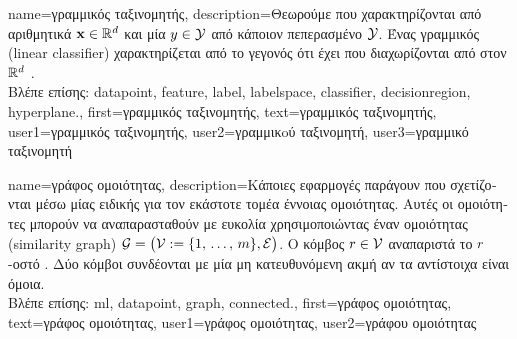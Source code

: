 {name={\foreignlanguage{greek}{γραμμικός ταξινομητής}}, 
	description={\foreignlanguage{greek}{Θεωρούμε} 
		 \foreignlanguage{greek}{που χαρακτηρίζονται από αριθμητικά}  
		${\bf x} \in \mathbb{R}^{d}$ \foreignlanguage{greek}{και μία}  $y \in \mathcal{Y}$ 
		\foreignlanguage{greek}{από κάποιον πεπερασμένο}  $\mathcal{Y}$. 
		\foreignlanguage{greek}{Ένας γραμμικός}  (linear classifier) \foreignlanguage{greek}{χαρακτηρίζεται από 
		το γεγονός ότι έχει}  \foreignlanguage{greek}{που διαχωρίζονται από}   
		\foreignlanguage{greek}{στον} $\mathbb{R}^{d}$ \cite[\foreignlanguage{greek}{Κεφ.} 2]{MLBasics}.
		\\
		\foreignlanguage{greek}{Βλέπε επίσης:} \gls{datapoint}, \gls{feature}, \gls{label}, \gls{labelspace}, \gls{classifier}, 
		\gls{decisionregion}, \gls{hyperplane}.},
	first={\foreignlanguage{greek}{γραμμικός ταξινομητής}},
	text={\foreignlanguage{greek}{γραμμικός ταξινομητής}},
	user1={\foreignlanguage{greek}{γραμμικός ταξινομητής}}, %
	user2={\foreignlanguage{greek}{γραμμι\-κoύ ταξινομητή}}, %
	user3={\foreignlanguage{greek}{γραμμικό ταξινομητή}} %
}

{name={\foreignlanguage{greek}{γράφος ομοιότητας}}, 
 	description={\foreignlanguage{greek}{Κάποιες εφαρμογές}  
		\foreignlanguage{greek}{παράγουν}  \foreignlanguage{greek}{που σχετίζονται μέσω μίας ειδικής 
		για τον εκάστοτε τομέα έννοιας ομοιότητας. Αυτές οι ομοιότητες μπορούν να αναπαρασταθούν με ευκολία
 		χρησιμοποιώντας έναν}  \foreignlanguage{greek}{ομοιότητας} (similarity graph) 
		$\mathcal{G} = \big(\mathcal{V} := \{1, \,\ldots, \,m\},\mathcal{E}\big)$. 
 		\foreignlanguage{greek}{Ο κόμβος $r \in \mathcal{V}$ αναπαριστά το $r$-οστό} . 
		\foreignlanguage{greek}{Δύο κόμβοι συνδέονται με μία μη κατευθυνόμενη ακμή αν τα αντίστοιχα}  
 		 \foreignlanguage{greek}{είναι όμοια}. 
		\\
		\foreignlanguage{greek}{Βλέπε επίσης:} \gls{ml}, \gls{datapoint}, \gls{graph}, \gls{connected}.},
 	first={\foreignlanguage{greek}{γράφος ομοιότητας}},
	text={\foreignlanguage{greek}{γράφος ομοιότητας}},
	user1={\foreignlanguage{greek}{γράφος ομοιότητας}}, %
  	user2={\foreignlanguage{greek}{γράφου ομοιότητας}} %
}

